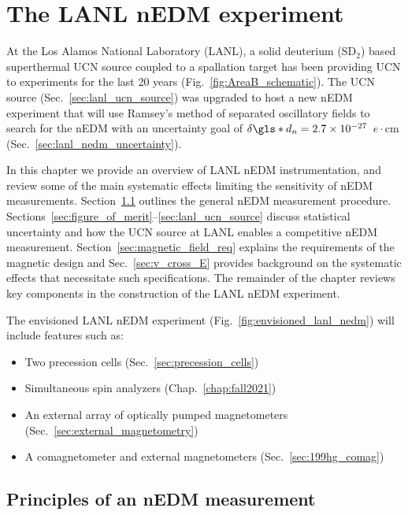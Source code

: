 
\chapter{The LANL nEDM experiment}\label{chap:LANL_nEDM}


At the Los Alamos National Laboratory (LANL), a solid deuterium (SD$_2$) based superthermal UCN source coupled to a spallation target has been providing UCN to experiments for the last 20 years (Fig.~\ref{fig:AreaB_schematic}). The UCN source (Sec.~\ref{sec:lanl_ucn_source}) was upgraded to host a new nEDM experiment that will use Ramsey's method of separated oscillatory fields to search for the nEDM with an uncertainty goal of $\delta \gls*{d_n} = 2.7\times 10^{-27}$~$e\cdot\text{cm}$ (Sec.~\ref{sec:lanl_nedm_uncertainty}).

In this chapter we provide an overview of LANL nEDM instrumentation, and review some of the main systematic effects limiting the sensitivity of nEDM measurements. Section~\ref{sec:principles_nEDM} outlines the general nEDM measurement procedure. Sections~\ref{sec:figure_of_merit}--\ref{sec:lanl_ucn_source} discuss statistical uncertainty and how the UCN source at LANL enables a competitive nEDM measurement. Section~\ref{sec:magnetic_field_req} explains the requirements of the magnetic design and Sec.~\ref{sec:v_cross_E} provides background on the systematic effects that necessitate such specifications. The remainder of the chapter reviews key components in the construction of the LANL nEDM experiment.

The envisioned LANL nEDM experiment (Fig.~\ref{fig:envisioned_lanl_nedm}) will include features such as:
%
\begin{itemize}
    \item Two precession cells (Sec.~\ref{sec:precession_cells})
    \item Simultaneous spin analyzers (Chap.~\ref{chap:fall2021})
    \item An external array of optically pumped magnetometers (Sec.~\ref{sec:external_magnetometry})
    \item A \hg comagnetometer and external \hg magnetometers (Sec.~\ref{sec:199hg_comag})
\end{itemize}


\section{Principles of an nEDM measurement}\label{sec:principles_nEDM}


